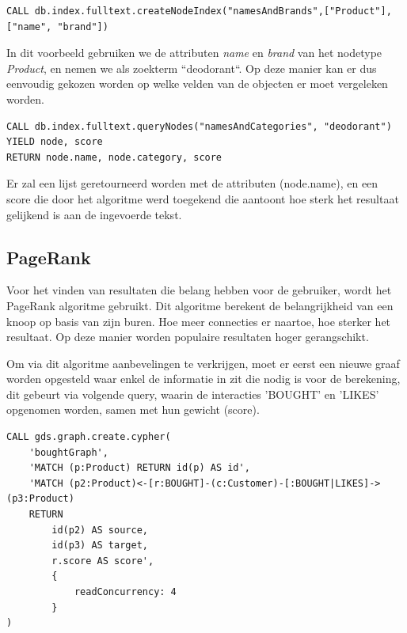 \begin{lstlisting}[caption={Een index creëren binnen Neo4j om zoekopdrachten op basis van tekst uit te voeren}]
CALL db.index.fulltext.createNodeIndex("namesAndBrands",["Product"],["name", "brand"])
\end{lstlisting}

In dit voorbeeld gebruiken we de attributen \textit{name} en \textit{brand} van het nodetype \textit{Product}, en nemen we als zoekterm ``deodorant``.  Op deze manier kan er dus eenvoudig gekozen worden op welke velden van de objecten er moet vergeleken worden.



\begin{lstlisting}[caption={Een zoekopdracht uitvoeren op basis van tekst}]
CALL db.index.fulltext.queryNodes("namesAndCategories", "deodorant") YIELD node, score
RETURN node.name, node.category, score
\end{lstlisting}

Er zal een lijst geretourneerd worden met de attributen (node.name), en een score die door het algoritme werd toegekend die aantoont hoe sterk het resultaat gelijkend is aan de ingevoerde tekst.

\subsection{PageRank}
\label{subsec:PageRank}

Voor het vinden van resultaten die belang hebben voor de gebruiker, wordt het PageRank algoritme gebruikt. Dit algoritme berekent de belangrijkheid van een knoop op basis van zijn buren. Hoe meer connecties er naartoe, hoe sterker het resultaat. Op deze manier worden populaire resultaten hoger gerangschikt.

Om via dit algoritme aanbevelingen te verkrijgen, moet er eerst een nieuwe graaf worden opgesteld waar enkel de informatie in zit die nodig is voor de berekening, dit gebeurt via volgende query, waarin de interacties 'BOUGHT' en 'LIKES' opgenomen worden, samen met hun gewicht (score).

\begin{lstlisting}[caption={Een genoemde graaf creëren om graafalgoritmen op uit te voeren}]
CALL gds.graph.create.cypher(
	'boughtGraph',
	'MATCH (p:Product) RETURN id(p) AS id',
	'MATCH (p2:Product)<-[r:BOUGHT]-(c:Customer)-[:BOUGHT|LIKES]->(p3:Product)
	RETURN
		id(p2) AS source,
		id(p3) AS target,
		r.score AS score',
		{
			readConcurrency: 4
		}
)
\end{lstlisting}


